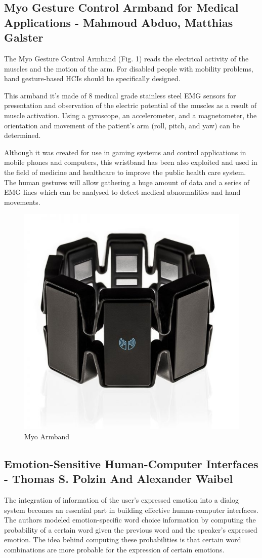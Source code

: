 \documentclass[12pt, twoside]{article}
\begin{document}
\subsection{Myo Gesture Control Armband for Medical Applications - Mahmoud Abduo, Matthias Galster\cite{1}}
The Myo Gesture Control Armband (Fig. 1) reads the electrical activity of the muscles and the motion of the arm. For disabled people with mobility problems, hand gesture-based HCIs should be specifically designed.

This armband it’s made of 8 medical grade stainless steel EMG sensors for presentation and observation of the electric potential of the muscles as a result of muscle activation. Using a gyroscope, an accelerometer, and a magnetometer, the orientation and movement of the patient's arm (roll, pitch, and yaw) can be determined.

Although it was created for use in gaming systems and control applications in mobile phones and computers, this wristband has been also exploited and used in the field of medicine and healthcare to improve the public health care system. The human gestures will allow gathering a huge amount of data and a series of EMG lines which can be analysed to detect medical abnormalities and hand movements.
\begin{figure}[!h]
    \centering
    \includegraphics[width=0.4\linewidth]{photo1}
    \caption{Myo Armband}
\end{figure}

\subsection{Emotion-Sensitive Human-Computer Interfaces - Thomas S. Polzin And Alexander Waibel\cite{2}}
The integration of information of the user's expressed emotion into a dialog system becomes an essential part in building effective human-computer interfaces.  The authors modeled emotion-specific word choice information by computing the probability of a certain word given the previous word and the speaker's expressed emotion. The idea behind computing these probabilities is that certain word combinations are more probable for the expression of certain emotions.
\end{document}
